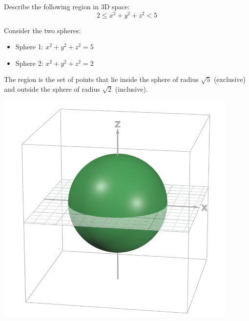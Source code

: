 \documentclass{article}
\begin{document}
\begin{examplebox}
    Describe the following region in 3D space:
    \[
        2 \leq x^2 + y^2 + z^2 < 5
    \]

    \begin{solutionbox}
        Consider the two spheres:
        \begin{itemize}
            \item Sphere 1: \( x^2 + y^2 + z^2 = 5 \)
            \item Sphere 2: \( x^2 + y^2 + z^2 = 2 \)
        \end{itemize}

        The region is the set of points that lie inside the sphere of radius \( \sqrt{5} \) (exclusive) and outside the sphere of radius \( \sqrt{2} \) (inclusive).

        \begin{center}
            \begin{minipage}{0.3\textwidth}
                \centering
                \includegraphics[width=0.9\textwidth]{region between 2.png}
                \captionsetup{justification=centerlast}
            \end{minipage}%
            \hfill
            \begin{minipage}{0.3\textwidth}
                \centering

\end{minipage}
\end{center}
\end{solutionbox}
\end{examplebox}
\end{document}
